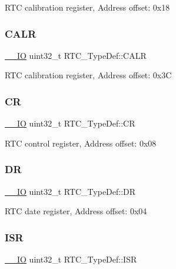 R\+TC calibration register, Address offset\+: 0x18 \mbox{\label{struct_r_t_c___type_def_aea66ea813830c2f3ff207464794397a4}} 
\subsubsection{\texorpdfstring{C\+A\+LR}{CALR}}
{\footnotesize\ttfamily \hyperlink{core__sc300_8h_aec43007d9998a0a0e01faede4133d6be}{\+\_\+\+\_\+\+IO} uint32\+\_\+t R\+T\+C\+\_\+\+Type\+Def\+::\+C\+A\+LR}

R\+TC calibration register, Address offset\+: 0x3C \mbox{\label{struct_r_t_c___type_def_a731d9209ce40dce6ea61fcc6f818c892}} 
\subsubsection{\texorpdfstring{CR}{CR}}
{\footnotesize\ttfamily \hyperlink{core__sc300_8h_aec43007d9998a0a0e01faede4133d6be}{\+\_\+\+\_\+\+IO} uint32\+\_\+t R\+T\+C\+\_\+\+Type\+Def\+::\+CR}

R\+TC control register, Address offset\+: 0x08 \mbox{\label{struct_r_t_c___type_def_a8750eae683cb3d382476dc7cdcd92b96}} 
\subsubsection{\texorpdfstring{DR}{DR}}
{\footnotesize\ttfamily \hyperlink{core__sc300_8h_aec43007d9998a0a0e01faede4133d6be}{\+\_\+\+\_\+\+IO} uint32\+\_\+t R\+T\+C\+\_\+\+Type\+Def\+::\+DR}

R\+TC date register, Address offset\+: 0x04 \mbox{\label{struct_r_t_c___type_def_a5a7b104d80b48b5708b50cdc487d6a78}} 
\subsubsection{\texorpdfstring{I\+SR}{ISR}}
{\footnotesize\ttfamily \hyperlink{core__sc300_8h_aec43007d9998a0a0e01faede4133d6be}{\+\_\+\+\_\+\+IO} uint32\+\_\+t R\+T\+C\+\_\+\+Type\+Def\+::\+I\+SR}

